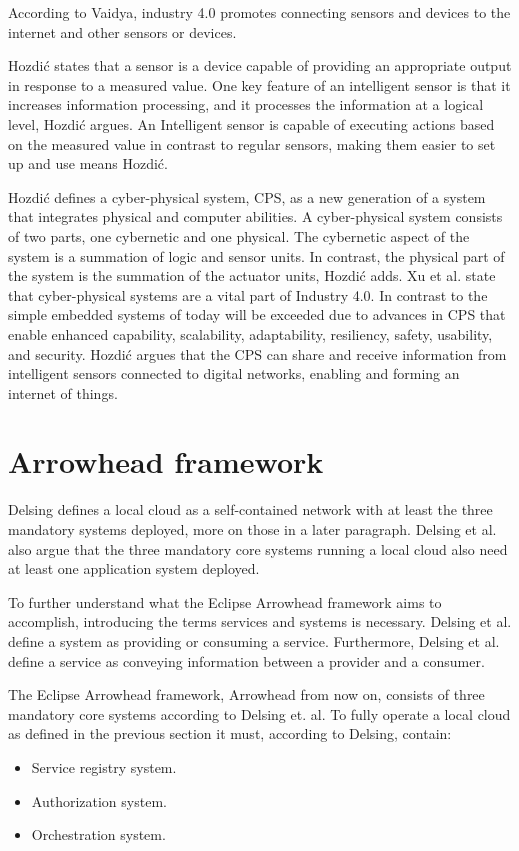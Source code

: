According to Vaidya, industry 4.0 promotes connecting sensors and devices to the internet and other sensors or devices.\cite{Vaidya2018} 

Hozdić states that a sensor is a device capable of providing an appropriate output in response to a measured value.
One key feature of an intelligent sensor is that it increases information processing, and it processes the information at a logical level, Hozdić argues.
An Intelligent sensor  is capable of executing actions based on the measured value in contrast to regular sensors, making them easier to set up and use means Hozdić.\cite{Hozdic2015} 

Hozdić defines a cyber-physical system, CPS, as a new generation of a system that integrates physical and computer abilities.
A cyber-physical system consists of two parts, one cybernetic and one physical.
The cybernetic aspect of the system is a summation of logic and sensor units. In contrast, the physical part of the system is the summation of the actuator units, Hozdić adds.
Xu et al. state that cyber-physical systems are a vital part of Industry 4.0. In contrast to the simple embedded systems of today will be exceeded due to advances in CPS that enable enhanced capability, scalability, adaptability, resiliency, safety, usability, and security.\cite{Xu2018}
Hozdić argues that the CPS can share and receive information from intelligent sensors connected to digital networks, enabling and forming an internet of things.\cite{Hozdic2015}
 
\section{Arrowhead framework}
Delsing defines a local cloud as a self-contained network with at least the three mandatory systems deployed, more on those in a later paragraph. 
Delsing et al. also argue that the three mandatory core systems running a local cloud also need at least one application system deployed.\cite{Delsing2017}

To further understand what the Eclipse Arrowhead framework aims to accomplish, introducing the terms services and systems is necessary.
Delsing et al. define a system as providing or consuming a service.
Furthermore, Delsing et al. define a service as conveying information between a provider and a consumer.\cite{Delsing2017}

The Eclipse Arrowhead framework, Arrowhead from now on, consists of three mandatory core systems according to Delsing et. al.
To fully operate a local cloud as defined in the previous section it must, according to Delsing, contain:
\begin{itemize}
    \item Service registry system.
    \item Authorization system. 
    \item Orchestration system.\cite{Delsing2017}
\end{itemize} 

